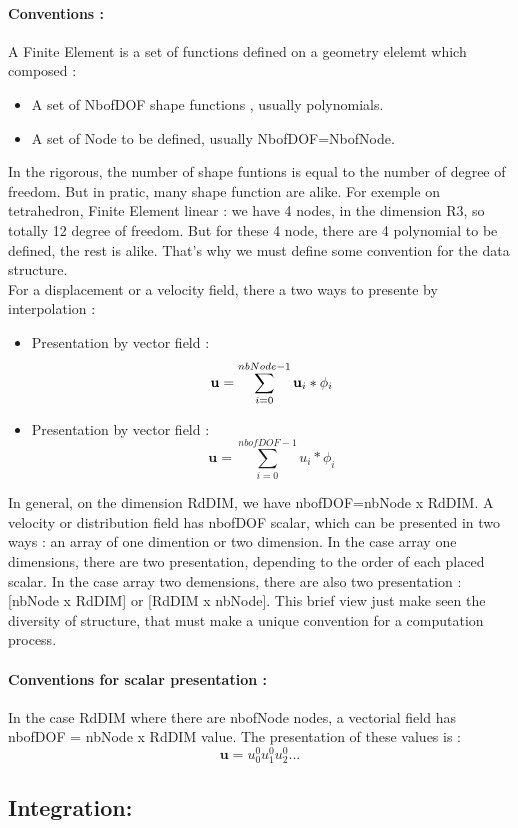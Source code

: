 \documentclass[a4paper,10pt]{article}
\begin{document}
\paragraph{Conventions : } A Finite Element is a set of functions defined on a geometry elelemt which composed :
\begin{itemize}
\item A set of NbofDOF shape functions , usually polynomials.
\item A set of Node to be defined, usually NbofDOF=NbofNode. 
\end{itemize} 
In the rigorous, the number of shape funtions is equal to the number of degree of freedom. But in pratic, many shape function are alike. For exemple on tetrahedron, Finite Element linear : we have 4 nodes, in the dimension R3, so totally 12 degree of freedom. But for these 4 node, there are 4 polynomial to be defined, the rest is alike. That's why we must define some convention for the data structure. \\
For a displacement or a velocity field, there a two ways to presente by interpolation :
\begin{itemize}
\item Presentation by vector field : 
               \[\textbf{u}=\sum_{i=0}^{nbNode-1} \textbf{u}_i * {\bf\phi}_i  \]
\item Presentation by vector field : 
               \[\textbf{u}=\sum_{i=0}^{nbofDOF-1} u_i * \phi_i  \]
\end{itemize} 
In general, on the dimension RdDIM, we have nbofDOF=nbNode x RdDIM. A velocity or distribution field has nbofDOF scalar, which can be presented in two ways : an array of one dimention or two dimension. In the case array one dimensions, there are two presentation, depending to the order of each placed scalar. In the case array two demensions, there are also two presentation :   [nbNode x RdDIM] or [RdDIM x nbNode]. This brief view just make seen the diversity of structure, that must make a unique convention for a computation process. 
\paragraph{Conventions for scalar presentation : }
In the case RdDIM where there are nbofNode nodes, a vectorial field has nbofDOF = nbNode x RdDIM  value. The presentation of these values is :
               \[ \textbf{u}= u_0^0 u_1^0 u_2^0 ...  \]
\subsection{Integration: }
\end{document}
